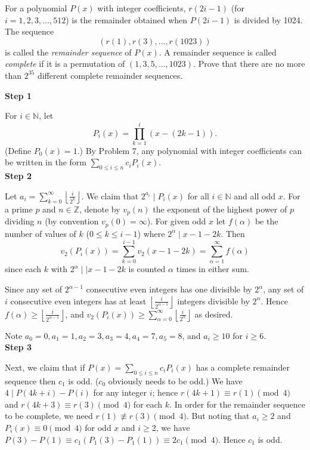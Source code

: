\begin{ex}[TST 2007/6]
For a polynomial $P(x)$ with integer coefficients, $r(2i-1)$ (for $i=1,2,3,\ldots, 512$) is the remainder obtained when $P(2i-1)$ is divided by 1024. The sequence
\[(r(1),r(3),\ldots, r(1023))\]
is called the \emph{remainder sequence} of $P(x)$. A remainder sequence is called \emph{complete} if it is a permutation of $(1,3,5,\ldots, 1023)$. Prove that there are no more than $2^{35}$ different complete remainder sequences.
\end{ex}

 \textbf{Step 1}

For $i\in \mathbb{N}$, let 
\[P_i(x)=\prod_{k=1}^i (x-(2k-1)).\]
(Define $P_0(x)=1$.)
By Problem 7, any polynomial with integer coefficients can be written in the form $\sum_{0\leq i \leq n} c_iP_i(x)$.\\

\noindent\textbf{Step 2}

Let $a_i=\sum_{k=0}^{\infty} \left\lfloor \frac{i}{2^k}\right\rfloor$. We claim that $2^{a_i}\mid P_i(x)$ for all $i\in\mathbb{N}$ and all odd $x$. For a prime $p$ and $n\in \mathbb{Z}$, denote by $v_p(n)$ the exponent of the highest power of $p$ dividing $n$ (by convention $v_p(0)=\infty$). For given odd $x$ let $f(\alpha)$ be the number of values of $k$ ($0\leq k\leq i-1$) where $2^{\alpha}\mid x-1-2k$. Then
\[v_2(P_i(x))=\sum_{k=0}^{i-1} v_2(x-1-2k)=\sum_{\alpha=1}^{\infty}f(\alpha)\]
since each $k$ with $2^{\alpha}\mid\mid x-1-2k$ is counted $\alpha$ times in either sum. %

Since any set of $2^{\alpha-1}$ consecutive even integers has one divisible by $2^{\alpha}$, any set of $i$ consecutive even integers has at least $\left\lfloor \frac{i}{2^{\alpha-1}}\right\rfloor$ integers divisible by $2^{\alpha}$. Hence $f(\alpha)\geq \left\lfloor \frac{i}{2^{\alpha-1}}\right\rfloor$, and $v_2(P_i(x))\geq \sum_{\alpha=0}^{\infty} \left\lfloor\frac{i}{2^{\alpha}}\right\rfloor$ as desired.

Note $a_0=0,a_1=1,a_2=3,a_3=4,a_4=7,a_5=8$, and $a_i\geq 10$ for $i\geq 6$.\\

\noindent \textbf{Step 3}

Next, we claim that if $P(x)=\sum_{0\leq i \leq n} c_iP_i(x)$ has a complete remainder sequence then $c_1$ is odd. ($c_0$ obviously needs to be odd.) We have $4\mid P(4k+i)-P(i)$ for any integer $i$; hence $r(4k+1)\equiv r(1)\pmod{4}$ and $r(4k+3)\equiv r(3)\pmod{4}$ for each $k$. In order for the remainder sequence to be complete, we need $r(1)\not\equiv r(3)\pmod{4}$. But noting that $a_i\geq 2$ and $P_i(x)\equiv 0\pmod{4}$ for odd $x$ and $i\geq 2$, we have $P(3)-P(1)\equiv c_1(P_1(3)-P_1(1))\equiv 2c_1\pmod{4}$. Hence $c_1$ is odd.\\


